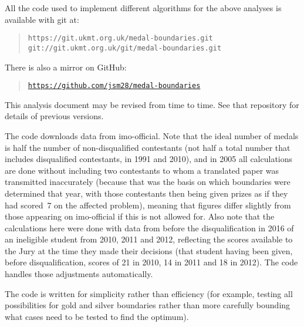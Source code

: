 \documentclass[a4paper,11pt]{article}
\begin{document}
All the code used to implement different algorithms for the above
analyses is available with git at:

\begin{quote}
\texttt{https://git.ukmt.org.uk/medal-boundaries.git} \\
\texttt{git://git.ukmt.org.uk/git/medal-boundaries.git}
\end{quote}

There is also a mirror on GitHub:

\begin{quote}
\texttt{\href{https://github.com/jsm28/medal-boundaries}{https://github.com/jsm28/medal-boundaries}}
\end{quote}

This analysis document may be revised from time to time.  See that
repository for details of previous versions.

The code downloads data from imo-official.  Note that the ideal number
of medals is half the number of non-disqualified contestants (not half
a total number that includes disqualified contestants, in 1991 and
2010), and in 2005 all calculations are done without including two
contestants to whom a translated paper was transmitted inaccurately
(because that was the basis on which boundaries were determined that
year, with those contestants then being given prizes as if they had
scored~7 on the affected problem), meaning that figures differ
slightly from those appearing on imo-official if this is not allowed
for.  Also note that the calculations here were done with data from
before the disqualification in 2016 of an ineligible student from
2010, 2011 and 2012, reflecting the scores available to the Jury at
the time they made their decisions (that student having been given,
before disqualification, scores of 21 in 2010, 14 in 2011 and 18 in
2012).  The code handles those adjustments automatically.

The code is written for simplicity rather than efficiency (for
example, testing all possibilities for gold and silver boundaries
rather than more carefully bounding what cases need to be tested to
find the optimum).
\end{document}
